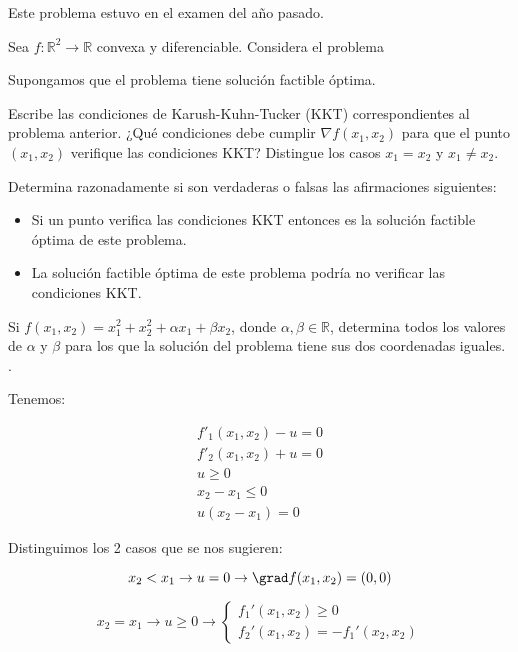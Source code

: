 \obs Este problema estuvo en el examen del año pasado.
\begin{problem}[5]
Sea $f:\mathbb{R}^2\to\mathbb{R}$ convexa y diferenciable.
%
Considera el problema

\begin{ioprob}
\end{ioprob}

Supongamos que el problema tiene solución factible óptima.

\ppart Escribe las condiciones de Karush-Kuhn-Tucker (KKT) correspondientes al problema anterior. ¿Qué condiciones debe cumplir $\nabla f(x_1,x_2)$ para que el punto $(x_1,x_2)$ verifique las condiciones KKT? Distingue los casos $x_1=x_2$ y $x_1\neq x_2$.

\ppart Determina razonadamente si son verdaderas o falsas las  afirmaciones siguientes: 

	\begin{itemize}	
		\item Si un punto verifica las condiciones KKT entonces es la solución factible óptima de este problema.
		
		\item La solución factible óptima de este problema podría no verificar las condiciones KKT.
	\end{itemize}


\ppart Si $f(x_1,x_2)=x_1^2+x_2^2+\alpha x_1 + \beta x_2$, donde $\alpha,\beta\in\mathbb{R}$, determina todos los valores de $\alpha$ y $\beta$ para los que la solución del problema tiene sus dos coordenadas iguales. .


\solution

Tenemos:

\[
	\begin{array}{c}
		f'_1(x_1,x_2) - u = 0\\
		f'_2(x_1,x_2) + u = 0\\
		u≥0\\
		x_2-x_1 ≤ 0\\
		u(x_2-x_1) = 0
	\end{array}
\]

Distinguimos los 2 casos que se nos sugieren:

\[x_2 < x_1 \to u = 0 \to \grad f(x_1,x_2) = (0,0)\]

\[x_2 = x_1 \to u ≥ 0 \to  \left\{ 
	\begin{array}{c}
		f_1'(x_1,x_2) ≥ 0\\
		f_2'(x_1,x_2) = - f_1'(x_2,x_2)
	\end{array}\right.
\]


\end{problem}
